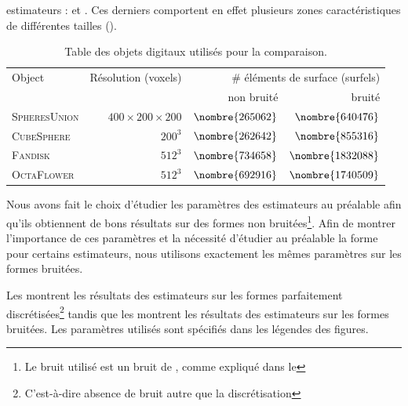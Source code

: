 estimateurs : \SpheresUnion et \CubeSphere. Ces derniers
comportent en effet plusieurs zones caractéristiques de différentes tailles
().
%
\begin{table}[h]
  \begin{center}
    \caption{Table des objets digitaux utilisés pour la comparaison.}
    \label{tab:feature-objects}
    \begin{tabular}{@{}lrrr@{}}
      \toprule
      Object & Résolution (voxels) & \multicolumn{2}{r}{\# éléments de surface (surfels)} \\ \cmidrule(l){3-4}
                     &            & non bruité & bruité \\ \midrule
      \textsc{SpheresUnion}    & $400 \times 200 \times 200$ & $\nombre{265062}$ & $\nombre{640476}$ \\
      \textsc{CubeSphere}     & $200^3$    & $\nombre{262642}$ & $\nombre{855316}$   \\
      \textsc{Fandisk}        & $512^3$    & $\nombre{734658}$ & $\nombre{1832088}$   \\
      \textsc{OctaFlower}     & $512^3$    & $\nombre{692916}$ & $\nombre{1740509}$   \\ \bottomrule
    \end{tabular}
  \end{center}
\end{table}


Nous avons fait le choix d'étudier les paramètres des estimateurs au préalable
afin qu'ils obtiennent de bons résultats sur des formes non bruitées\footnote{Le
bruit utilisé est un bruit de \Kanungo, comme expliqué dans le
}. Afin de montrer l'importance de ces paramètres et
la nécessité d'étudier au préalable la forme pour certains estimateurs, nous
utilisons exactement les mêmes paramètres sur les formes bruitées.


Les  montrent les
résultats des estimateurs sur les formes parfaitement
discrétisées\footnote{C'est-à-dire absence de bruit autre que la discrétisation}
tandis que les
montrent les résultats des estimateurs sur les formes bruitées. Les paramètres
utilisés sont spécifiés dans les légendes des figures.

